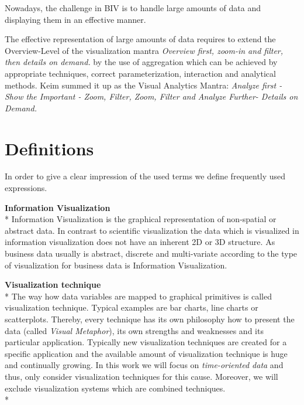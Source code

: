 Nowadays, the challenge in BIV is to handle large amounts of data and displaying them in an effective manner. 


The effective representation of large amounts of data requires to extend the Overview-Level of the visualization mantra\cite{Shneiderman2008} \textit{Overview first, zoom-in and filter, then details on demand.} by the use of aggregation which can be achieved by appropriate techniques, correct parameterization, interaction and analytical methods\cite{Aigner2008}. Keim summed it up as the Visual Analytics Mantra\cite{Aigner2011}: \textit{Analyze first - Show the Important - Zoom, Filter, Zoom, Filter and Analyze Further- Details on Demand.} 



\section{Definitions}
In order to give a clear impression of the used terms we define frequently used expressions.

\textbf{Information Visualization}\\*
Information Visualization is the graphical representation of non-spatial or abstract data\cite{Keim}. In contrast to scientific visualization the data which is visualized in information visualization does not have an inherent 2D or 3D structure\cite{Shneiderman2008}. 
As business data usually is abstract, discrete and multi-variate according to \cite{Tegarden1999} the type of visualization for business data is Information Visualization.

\textbf{Visualization technique}\\*
The way how data variables are mapped to graphical primitives is called visualization technique. Typical examples are bar charts, line charts or scatterplots. Thereby, every technique has its own philosophy how to present the data (called \textit{Visual Metaphor}\cite{Tegarden1999}), its own strengths and weaknesses and its particular application. Typically new visualization techniques are created for a specific application and the available amount of visualization technique is huge and continually growing. In this work we will focus on \textit{time-oriented data} and thus, only consider visualization techniques for this cause. Moreover, we will exclude visualization systems which are combined techniques. 
\\*

